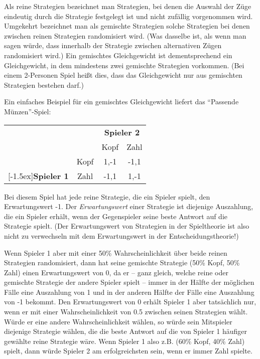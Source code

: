 Als reine Strategien bezeichnet man Strategien, bei denen die Auswahl der Züge
eindeutig durch die Strategie festgelegt ist und nicht zufällig vorgenommen
wird. Umgekehrt bezeichnet man als gemischte Strategien solche Strategien bei
denen zwischen reinen Strategien randomisiert wird. (Was dasselbe ist, als wenn
man sagen würde, dass innerhalb der Strategie zwischen alternativen Zügen
randomisiert wird.) Ein gemischtes Gleichgewicht ist dementsprechend ein
Gleichgewicht, in dem mindestens zwei gemischte Strategien vorkommen. (Bei
einem 2-Personen Spiel heißt dies, dass das Gleichgewicht nur aus gemischten
Strategien bestehen darf.)
 
Ein einfaches Beispiel für ein gemischtes Gleichgewicht liefert das 
"`Passende Münzen"'-Spiel:

\begin{center}
\begin{tabular}{cc|c|c|}
& \multicolumn{1}{c}{} & \multicolumn{2}{c}{\bf Spieler 2} \\
& \multicolumn{1}{c}{} & \multicolumn{1}{c}{Kopf} & \multicolumn{1}{c}{Zahl}
\\ \cline{3-4} 
& Kopf                 & 1,-1                     & -1,1   \\ \cline{3-4}
\raisebox{1.5ex}[-1.5ex]{{\bf Spieler 1}} 
& Zahl                 & -1,1                     & 1,-1  \\ \cline{3-4}
\end{tabular}
\end{center}

Bei diesem Spiel hat jede reine Strategie, die ein Spieler spielt, den
Erwartungswert -1. Der {\em Erwartungswert} einer Strategie ist diejenige
Auszahlung, die ein Spieler erhält, wenn der Gegenspieler seine beste Antwort auf die
Strategie spielt. (Der Erwartungswert von Strategien in der Spieltheorie ist
also nicht zu verwechseln mit dem Erwartungswert in der Entscheidungstheorie!)

Wenn Spieler 1 aber mit einer 50\% Wahrscheinlichkeit über beide reinen
Strategien randomisiert, dann hat seine gemischte Strategie (50\% Kopf, 50\%
Zahl) einen Erwartungswert von 0, da er -- ganz gleich, welche reine oder
gemischte Strategie der andere Spieler spielt -- immer in der Hälfte der
möglichen Fälle eine Auszahlung von 1 und in der anderen Hälfte der Fälle eine
Auszahlung von -1 bekommt. Den Erwartungswert von 0 erhält Spieler 1 aber
tatsächlich nur, wenn er mit einer Wahrscheinlichkeit von 0.5 zwischen seinen Strategien 
wählt. Würde er eine andere Wahrscheinlichkeit wählen, so würde sein Mitspieler
diejenige Strategie wählen, die die beste Antwort auf die von Spieler 1 häufiger gewählte
reine Strategie wäre. Wenn Spieler 1 also z.B. (60\% Kopf, 40\% Zahl) spielt,
dann würde Spieler 2 am erfolgreichsten sein, wenn er immer Zahl spielte.

